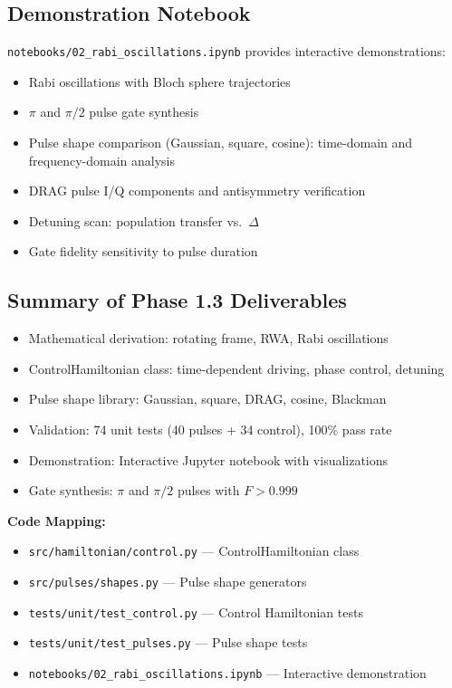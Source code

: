 \documentclass[11pt,a4paper]{article}
\theoremstyle{definition}
\theoremstyle{remark}
\begin{document}
\subsection{Demonstration Notebook}

\texttt{notebooks/02\_rabi\_oscillations.ipynb} provides interactive demonstrations:
\begin{itemize}
    \item Rabi oscillations with Bloch sphere trajectories
    \item $\pi$ and $\pi/2$ pulse gate synthesis
    \item Pulse shape comparison (Gaussian, square, cosine): time-domain and frequency-domain analysis
    \item DRAG pulse I/Q components and antisymmetry verification
    \item Detuning scan: population transfer vs.\ $\Delta$
    \item Gate fidelity sensitivity to pulse duration
\end{itemize}

\subsection{Summary of Phase 1.3 Deliverables}

\begin{itemize}
    \item Mathematical derivation: rotating frame, RWA, Rabi oscillations
    \item ControlHamiltonian class: time-dependent driving, phase control, detuning
    \item Pulse shape library: Gaussian, square, DRAG, cosine, Blackman
    \item Validation: 74 unit tests (40 pulses + 34 control), 100\% pass rate
    \item Demonstration: Interactive Jupyter notebook with visualizations
    \item Gate synthesis: $\pi$ and $\pi/2$ pulses with $F > 0.999$
\end{itemize}

\textbf{Code Mapping:}
\begin{itemize}
    \item \texttt{src/hamiltonian/control.py} — ControlHamiltonian class
    \item \texttt{src/pulses/shapes.py} — Pulse shape generators
    \item \texttt{tests/unit/test\_control.py} — Control Hamiltonian tests
    \item \texttt{tests/unit/test\_pulses.py} — Pulse shape tests
    \item \texttt{notebooks/02\_rabi\_oscillations.ipynb} — Interactive demonstration
\end{itemize}
\end{document}
